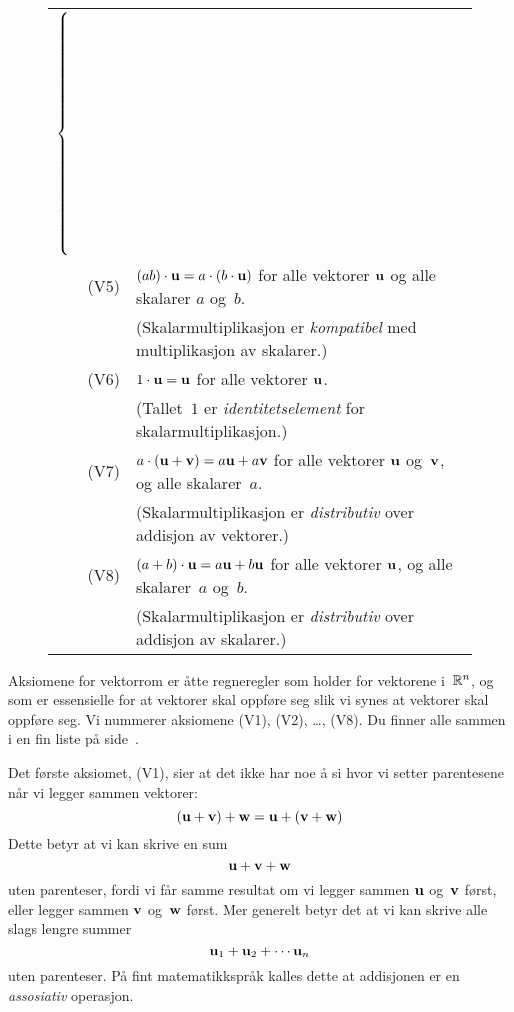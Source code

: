 \begin{figure*}[p]
\begin{center}
\begin{minipage}{.9\textwidth}
\begin{center}
\begin{tabular}{rll}
{$\left\{\rule{0pt}{90pt}\right.$
}
\\[-4pt]
& {\large {\LARGE(}V5{\LARGE)}} &
$(ab) \cdot \mathbf{u} = a \cdot (b \cdot \mathbf{u})$
for alle vektorer $\mathbf{u}$ og alle skalarer $a$ og~$b$.
\\[4pt]
&&{\small (Skalarmultiplikasjon er \emph{kompatibel} med multiplikasjon av skalarer.)}
\\[10pt]
& {\large {\LARGE(}V6{\LARGE)}} &
$1 \cdot \mathbf{u} = \mathbf{u}$
for alle vektorer $\mathbf{u}$.
\\[4pt]
&&{\small (Tallet~$1$ er \emph{identitetselement} for skalarmultiplikasjon.)}
\\[10pt]
& {\large {\LARGE(}V7{\LARGE)}} &
$a \cdot (\mathbf{u} + \mathbf{v}) = a \mathbf{u} + a \mathbf{v}$
for alle vektorer $\mathbf{u}$ og~$\mathbf{v}$, og alle skalarer~$a$.
\\[4pt]
&&{\small (Skalarmultiplikasjon er \emph{distributiv} over addisjon av vektorer.)}
\\[10pt]
& {\large {\LARGE(}V8{\LARGE)}} &
$(a + b) \cdot \mathbf{u} = a \mathbf{u} + b \mathbf{u}$
for alle vektorer $\mathbf{u}$, og alle skalarer~$a$ og~$b$.
\\[4pt]
&&{\small (Skalarmultiplikasjon er \emph{distributiv} over addisjon av skalarer.)}
\end{tabular}
\hspace{10pt}\hbox{}

\vspace{30pt}
\end{center}
\end{minipage}
\end{center}
\label{fig:aksiomene}
\end{figure*}

Aksiomene for vektorrom er åtte regneregler som holder for vektorene
i~$\mathbb{R}^n$, og som er essensielle for at vektorer skal oppføre seg slik
vi synes at vektorer skal oppføre seg.  Vi nummerer aksiomene (V1),
(V2), \ldots, (V8).  Du finner alle sammen i en fin liste på
side~\pageref{fig:aksiomene}.

Det første aksiomet, (V1), sier at det ikke har noe å si hvor vi
setter parentesene når vi legger sammen vektorer:
\[
(\mathbf{u} + \mathbf{v}) + \mathbf{w} = \mathbf{u} + (\mathbf{v} + \mathbf{w})
\]
Dette betyr at vi kan skrive en sum
\[
\mathbf{u} + \mathbf{v} + \mathbf{w}
\]
uten parenteser, fordi vi får samme resultat om vi legger sammen
$\mathbf{u}$ og~$\mathbf{v}$ først, eller legger sammen $\mathbf{v}$ og~$\mathbf{w}$
først.  Mer generelt betyr det at vi kan skrive alle slags lengre
summer
\[
\mathbf{u}_1 + \mathbf{u}_2 + \cdots \mathbf{u}_n
\]
uten parenteser.  På fint matematikkspråk kalles dette at addisjonen
er en \emph{assosiativ} operasjon.

